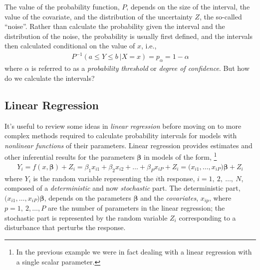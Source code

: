 The value of the probability function, \(P\), 
depends on the size of the interval, 
the value of the covariate, 
and the distribution of the uncertainty \(Z\), 
the so-called ``noise''. 
Rather than calculate the probability given 
the interval and the distribution of the noise, 
the probability is usually first defined, 
and the intervals then calculated
conditional on the value of \(x\), i.e.,
\begin{align}
P^{- 1}(a \leq Y \leq b\ |X = x) = p_{\alpha} = 1 - \alpha
\end{align}
where \(\alpha\) is referred to as a \emph{probability threshold} or 
\emph{degree of confidence}. 
But how do we calculate the intervals?

\subsection{Linear Regression} %

It's useful to review some ideas in \emph{linear regression} before
moving on to more complex methods required to calculate probability
intervals for models with \emph{nonlinear functions} of their parameters. 
Linear regression provides estimates and other inferential results 
for the parameters \(\boldsymbol{\beta}\) in models of the form,%
\footnote{%
In the previous example we were in fact dealing with a
linear regression with a single scalar parameter.}
\begin{align}
Y_{i} = f\left( x,\boldsymbol{\beta} \right) + Z_{i} = 
\beta_{1}x_{i1} + \beta_{2}x_{i2} + \ldots + \beta_{P}x_{iP} + Z_{i} = 
(x_{i1}\boldsymbol{,\ldots,}x_{iP}\boldsymbol{)\beta} + Z_{i}
\end{align}
where \(Y_{i}\) is the random variable representing the \(i\)th
response, \(i = 1,\ 2,\ \ldots,\ N\), composed of a \emph{deterministic}
and now \emph{stochastic} part. The deterministic part,
\((x_{i1}\boldsymbol{,\ldots,}x_{iP}\boldsymbol{)\beta}\), depends on the
parameters \(\boldsymbol{\beta}\) and the \emph{covariates}, \(x_{ip}\),
where \(p = 1,\ 2,\ldots,P\) are the number of parameters in the linear
regression; the stochastic part is represented by the random variable
\(Z_{i}\) corresponding to a disturbance that perturbs the response.

